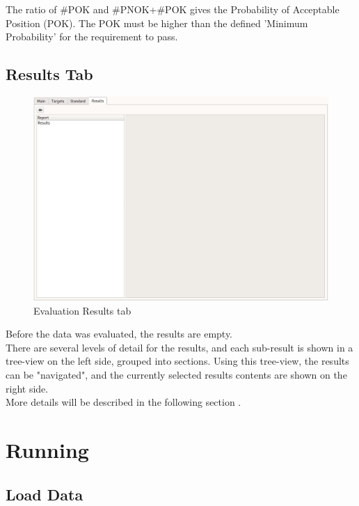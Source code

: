 The ratio of \#POK and \#PNOK+\#POK gives the Probability of Acceptable Position (POK). The POK must be higher than the defined 'Minimum Probability' for the requirement to pass.

\subsection{Results Tab}

\begin{figure}[H]
  \hspace*{-2cm}
    \includegraphics[width=18cm,frame]{../screenshots/eval_results_empty.png}
  \caption{Evaluation Results tab}
\end{figure}

Before the data was evaluated, the results are empty.\\

There are several levels of detail for the results, and each sub-result is shown in a tree-view on the left side, grouped into sections. Using this tree-view, the results can be "navigated", and the currently selected results contents are shown on the right side. \\

More details will be described in the following section .

\section{Running}
\label{sec:eval_run} 

\subsection{Load Data}
\label{sec:eval_run_load} 

